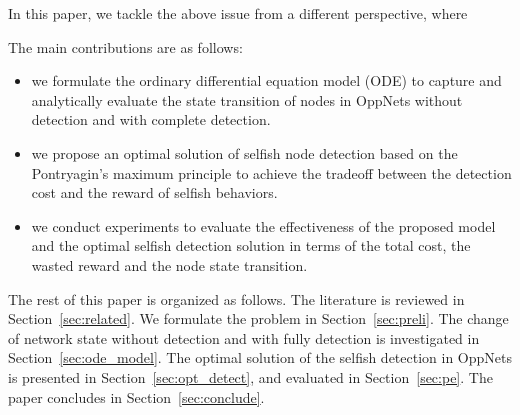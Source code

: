 In this paper, we tackle the above issue
from a different perspective, where




The main contributions are as follows:

\begin{itemize}
\item {we formulate the ordinary differential equation model (ODE)
to capture and analytically evaluate the state transition of nodes
in OppNets without detection and with complete detection.}
\item {we propose an optimal solution of selfish node detection
based on the Pontryagin's maximum principle
to achieve the tradeoff between the detection cost
and the reward of selfish behaviors.}
\item {we conduct experiments to evaluate
the effectiveness of the proposed model
and the optimal selfish detection solution
in terms of the total cost, the wasted reward and the node state transition.}
\end{itemize}

The rest of this paper is organized as follows.
The literature is reviewed in Section~\ref{sec:related}.
We formulate the problem in Section~\ref{sec:preli}.
The change of network state without detection and with fully detection
is investigated in Section~\ref{sec:ode_model}.
The optimal solution of the selfish detection in OppNets
is presented in Section~\ref{sec:opt_detect},
and evaluated in Section~\ref{sec:pe}.
The paper concludes in Section~\ref{sec:conclude}.
